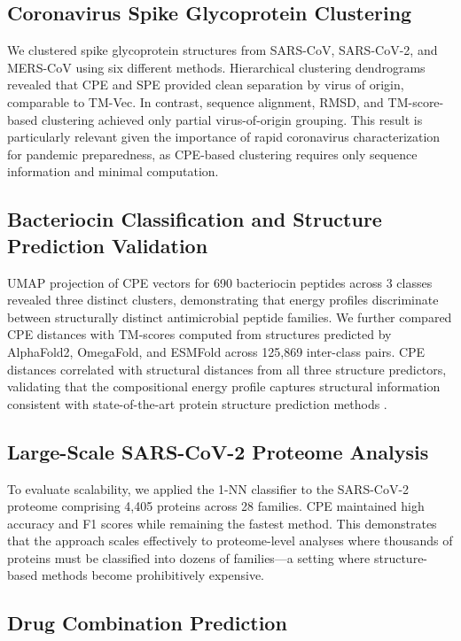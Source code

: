 \documentclass[11pt]{article}
\begin{document}
\subsection{Coronavirus Spike Glycoprotein Clustering}

We clustered spike glycoprotein structures from SARS-CoV, SARS-CoV-2, and MERS-CoV using six different methods. Hierarchical clustering dendrograms revealed that CPE and SPE provided clean separation by virus of origin, comparable to TM-Vec. In contrast, sequence alignment, RMSD, and TM-score-based clustering achieved only partial virus-of-origin grouping. This result is particularly relevant given the importance of rapid coronavirus characterization for pandemic preparedness, as CPE-based clustering requires only sequence information and minimal computation.

\subsection{Bacteriocin Classification and Structure Prediction Validation}

UMAP projection of CPE vectors for 690 bacteriocin peptides across 3 classes revealed three distinct clusters, demonstrating that energy profiles discriminate between structurally distinct antimicrobial peptide families. We further compared CPE distances with TM-scores computed from structures predicted by AlphaFold2, OmegaFold, and ESMFold across 125,869 inter-class pairs. CPE distances correlated with structural distances from all three structure predictors, validating that the compositional energy profile captures structural information consistent with state-of-the-art protein structure prediction methods \citep{jumper2021,lin2023}.

\subsection{Large-Scale SARS-CoV-2 Proteome Analysis}

To evaluate scalability, we applied the 1-NN classifier to the SARS-CoV-2 proteome comprising 4,405 proteins across 28 families. CPE maintained high accuracy and F1 scores while remaining the fastest method. This demonstrates that the approach scales effectively to proteome-level analyses where thousands of proteins must be classified into dozens of families---a setting where structure-based methods become prohibitively expensive.

\subsection{Drug Combination Prediction}
\end{document}
